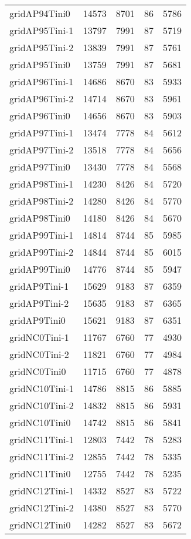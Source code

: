 \begin{longtable}{lrrrr}
gridAP94Tini0 & 14573 & 8701 & 86 & 5786 \\
gridAP95Tini-1 & 13797 & 7991 & 87 & 5719 \\
gridAP95Tini-2 & 13839 & 7991 & 87 & 5761 \\
gridAP95Tini0 & 13759 & 7991 & 87 & 5681 \\
gridAP96Tini-1 & 14686 & 8670 & 83 & 5933 \\
gridAP96Tini-2 & 14714 & 8670 & 83 & 5961 \\
gridAP96Tini0 & 14656 & 8670 & 83 & 5903 \\
gridAP97Tini-1 & 13474 & 7778 & 84 & 5612 \\
gridAP97Tini-2 & 13518 & 7778 & 84 & 5656 \\
gridAP97Tini0 & 13430 & 7778 & 84 & 5568 \\
gridAP98Tini-1 & 14230 & 8426 & 84 & 5720 \\
gridAP98Tini-2 & 14280 & 8426 & 84 & 5770 \\
gridAP98Tini0 & 14180 & 8426 & 84 & 5670 \\
gridAP99Tini-1 & 14814 & 8744 & 85 & 5985 \\
gridAP99Tini-2 & 14844 & 8744 & 85 & 6015 \\
gridAP99Tini0 & 14776 & 8744 & 85 & 5947 \\
gridAP9Tini-1 & 15629 & 9183 & 87 & 6359 \\
gridAP9Tini-2 & 15635 & 9183 & 87 & 6365 \\
gridAP9Tini0 & 15621 & 9183 & 87 & 6351 \\
gridNC0Tini-1 & 11767 & 6760 & 77 & 4930 \\
gridNC0Tini-2 & 11821 & 6760 & 77 & 4984 \\
gridNC0Tini0 & 11715 & 6760 & 77 & 4878 \\
gridNC10Tini-1 & 14786 & 8815 & 86 & 5885 \\
gridNC10Tini-2 & 14832 & 8815 & 86 & 5931 \\
gridNC10Tini0 & 14742 & 8815 & 86 & 5841 \\
gridNC11Tini-1 & 12803 & 7442 & 78 & 5283 \\
gridNC11Tini-2 & 12855 & 7442 & 78 & 5335 \\
gridNC11Tini0 & 12755 & 7442 & 78 & 5235 \\
gridNC12Tini-1 & 14332 & 8527 & 83 & 5722 \\
gridNC12Tini-2 & 14380 & 8527 & 83 & 5770 \\
gridNC12Tini0 & 14282 & 8527 & 83 & 5672 \\

\end{longtable}
